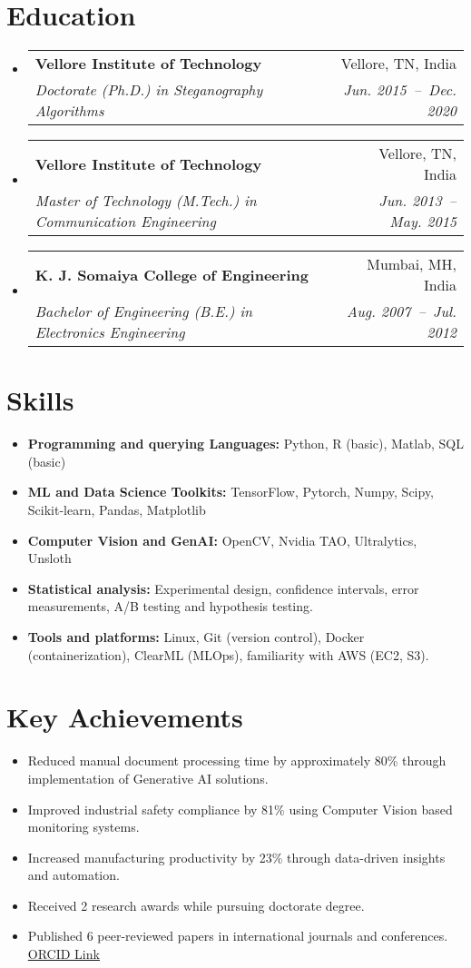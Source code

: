 \documentclass[a4paper,11pt]{article}
\makeatletter
\newcommand{\resumeSubheading}[4]{
  \vspace{-1pt}\item
    \begin{tabular*}{0.97\textwidth}[t]{l@{\extracolsep{\fill}}r}
      \textbf{#1} & #2 \\
      \textit{\small#3} & \textit{\small #4} \\
    \end{tabular*}\vspace{-5pt}
}
\newcommand{\resumeSubHeadingListStart}{\begin{itemize}[leftmargin=*]}
\newcommand{\resumeSubHeadingListEnd}{\end{itemize}}
\makeatother
\begin{document}
\section{Education}
  \resumeSubHeadingListStart
    \resumeSubheading
      {Vellore Institute of Technology}{Vellore, TN, India}
      {Doctorate (Ph.D.) in Steganography Algorithms}{Jun. 2015~--~Dec. 2020}
    \resumeSubheading
      {Vellore Institute of Technology}{Vellore, TN, India}
      {Master of Technology (M.Tech.) in Communication Engineering}{Jun. 2013~--~May. 2015}
    \resumeSubheading
      {K. J. Somaiya College of Engineering}{Mumbai, MH, India}
      {Bachelor of Engineering (B.E.) in Electronics Engineering}{Aug. 2007~--~Jul. 2012}
  \resumeSubHeadingListEnd

\section{Skills}
	\begin{itemize}[leftmargin=*, itemsep = -2pt]
    \item{\textbf{Programming and querying Languages:} Python, R (basic), Matlab, SQL (basic)}
		\item{\textbf{ML and Data Science Toolkits:} TensorFlow, Pytorch, Numpy, Scipy, Scikit-learn, Pandas, Matplotlib}
		\item{\textbf{Computer Vision and GenAI:} OpenCV, Nvidia TAO, Ultralytics, Unsloth}
		\item{\textbf{Statistical analysis:} Experimental design, confidence intervals, error measurements, A/B testing and hypothesis testing.}
    \item{\textbf{Tools and platforms:} Linux, Git (version control), Docker (containerization), ClearML (MLOps), familiarity with AWS (EC2, S3).}
	\end{itemize}

\section{Key Achievements}
  \begin{itemize}[leftmargin=*, itemsep = -4pt]
    \item{Reduced manual document processing time by approximately 80\% through implementation of Generative AI solutions.}
    \item{Improved industrial safety compliance by 81\% using Computer Vision based monitoring systems.}
    \item{Increased manufacturing productivity by 23\% through data-driven insights and automation.}
    \item{Received 2 research awards while pursuing doctorate degree.}
    \item{Published 6 peer-reviewed papers in international journals and conferences. \href{https://orcid.org/0000-0002-2247-9046}{ORCID Link}}
  \end{itemize}
\end{document}
